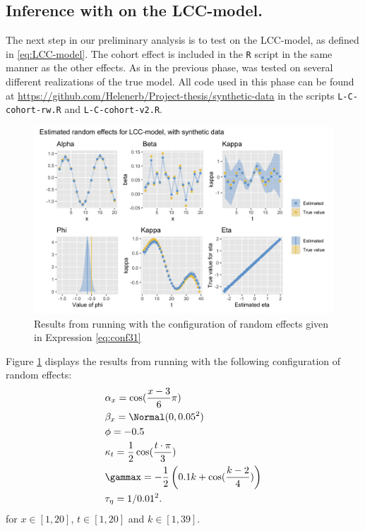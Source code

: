 \subsection{Inference with \inlabru on the LCC-model. }
The next step in our preliminary analysis is to test \inlabru on the LCC-model, as defined in \ref{eq:LCC-model}. The cohort effect is included in the \texttt{R} script in the same manner as the other effects. As in the previous phase, \inlabru was tested on several different realizations of the true model. All code used in this phase can be found at \url{https://github.com/Helenerb/Project-thesis/synthetic-data} in the scripts \texttt{L-C-cohort-rw.R} and \texttt{L-C-cohort-v2.R}.
\begin{figure}[h!]
    \centering
    \includegraphics[width=0.85\linewidth]{synthetic-data/Figures/effects-LCC-synthetic-3-1.png}
    \caption{Results from running \inlabru with the configuration of random effects given in Expression \ref{eq:conf31}}
    \label{fig:conf31}
\end{figure}
Figure \ref{fig:conf31} displays the results from running \inlabru with the following configuration of random effects:
\begin{equation}
    \begin{aligned}
        &\alpha_x = \cos(\frac{x-3}{6}\pi)\\
        &\beta_x = \Normal(0,0.05^2)\\
        &\phi = -0.5\\
        &\kappa_t = \frac{1}{2}\cos(\frac{t\cdot \pi}{3})\\
        &\gammax = -\frac{1}{2}\left( 0.1k + \cos(\frac{k-2}{4})\right)\\
        &\tau_{\eta} = 1/0.01^2.
    \end{aligned}
    \label{eq:conf31}
\end{equation}
for $x\in[1,20]$, $t \in [1,20]$ and $k \in [1,39]$. 

